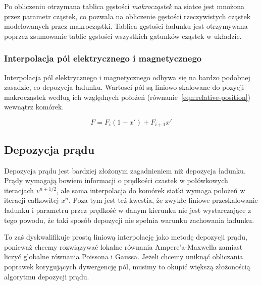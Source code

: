 
Po obliczeniu otrzymana tablica gęstości \emph{makrocząstek} na
siatce jest mnożona przez parametr  cząstek, co pozwala na
obliczenie gęstości rzeczywistych cząstek modelowanych przez makrocząstki.
Tablica gęstości ładunku jest otrzymywana poprzez zsumowanie tablic gęstości
wszystkich gatunków cząstek w układzie.

\subsubsection{Interpolacja pól elektrycznego i magnetycznego}

Interpolacja pól elektrycznego i magnetycznego odbywa się na bardzo podobnej
zasadzie, co depozycja ładunku. Wartosci pól są liniowo skalowane do pozycji
makrocząstek według ich względnych położeń (równanie~\ref{eqn:relative-position}) wewnątrz komórek.

\begin{equation}
    F = F_i (1-x') + F_{i+1} x'
    \label{eqn:field-interpolation}
\end{equation}

\subsection{Depozycja prądu} %

Depozycja prądu jest bardziej złożonym zagadnieniem niż depozycja ładunku.
Prądy wymagają bowiem informacji o prędkości czastek w połówkowych
iteracjach $v^{n+1/2}$, ale sama interpolacja do komórek siatki wymaga
położeń w iteracji całkowitej $x^{n}$. Poza tym jest też kwestia, że zwykłe
liniowe przeskalowanie ładunku i parametru  przez prędkość w
danym kierunku nie jest wystarczające z tego powodu, że taki sposób
depozycji nie spełnia warunku zachowania ładunku.



To zaś dyskwalifikuje prostą liniową interpolację jako metodę depozycji
prądu, ponieważ chcemy rozwiązywać lokalne równania Ampere'a-Maxwella
zamiast liczyć globalne równania Poissona i Gaussa.
Jeżeli chcemy uniknąć obliczania poprawek korygujących dywergencję pól,
musimy to okupić większą złożonością algorytmu depozycji prądu.


